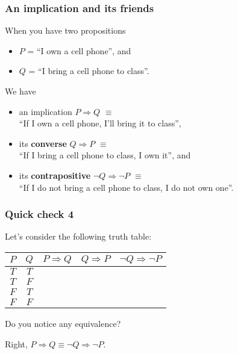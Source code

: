 \documentclass{beamer}
\begin{document}
\begin{frame}\frametitle{An implication and its friends}
  When you have two propositions
  \begin{itemize}
  \item $P$ = ``I own a cell phone'', and
  \item $Q$ = ``I bring a cell phone to class''.
  \end{itemize}
  We have
  \begin{itemize}
  \item an implication $P\Rightarrow Q$ $\equiv$ \\ ``If I own a cell phone,
    I'll bring it to class'',
  \item its {\bf converse} $Q\Rightarrow P$ $\equiv$ \\ ``If I bring a cell phone
    to class, I own it'', and
  \item its {\bf contrapositive} $\neg Q\Rightarrow\neg P$ $\equiv$ \\ ``If I do not
    bring a cell phone to class, I do not own one''.
  \end{itemize}
\end{frame}

\begin{frame}\frametitle{Quick check 4}
  Let's consider the following truth table:
  \begin{tcolorbox}
    \begin{tabular}{|c|c||c|c|c|}
      \hline
      $P$ & $Q$ & $P\Rightarrow Q$ & $Q\Rightarrow P$ & $\neg Q \Rightarrow \neg P$ \\
      \hline
      $T$ & $T$ & & & \\
      $T$ & $F$ & & & \\
      $F$ & $T$ & & & \\
      $F$ & $F$ & & & \\
      \hline
    \end{tabular}
  \end{tcolorbox}
  \pause
  Do you notice any equivalence?
  \pause

  Right, $P\Rightarrow Q\equiv \neg Q\Rightarrow\neg P$.
\end{frame}
\end{document}
